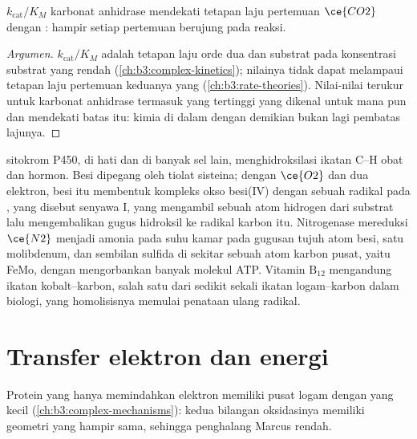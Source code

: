 \begin{proposition}\label{prop:b3:bioinorganic:carbonic-anhydrase}
 $k_{\mathrm{cat}}/K_M$ karbonat anhidrase mendekati tetapan laju
pertemuan $\ce{CO2}$ dengan : hampir setiap pertemuan berujung pada
reaksi.
\end{proposition}

\begin{proof}[Argumen]
$k_{\mathrm{cat}}/K_M$ adalah tetapan laju orde dua  dan substrat pada konsentrasi substrat yang rendah
(\cref{ch:b3:complex-kinetics}); nilainya tidak dapat melampaui
tetapan laju pertemuan keduanya yang 
(\cref{ch:b3:rate-theories}). Nilai-nilai terukur untuk karbonat anhidrase termasuk
yang tertinggi yang dikenal untuk  mana pun dan mendekati batas itu: kimia
di dalam  dengan demikian bukan lagi pembatas lajunya.
\end{proof}

 sitokrom P450, di hati dan di banyak sel lain, menghidroksilasi ikatan
C--H obat dan hormon. Besi  dipegang oleh tiolat sisteina; dengan
$\ce{O2}$ dan dua elektron, besi itu membentuk kompleks okso besi(IV) dengan sebuah radikal pada
, yang disebut senyawa I, yang mengambil sebuah atom hidrogen dari
substrat lalu mengembalikan gugus hidroksil ke radikal karbon itu. Nitrogenase
mereduksi $\ce{N2}$ menjadi amonia pada suhu kamar pada gugusan tujuh atom besi,
satu molibdenum, dan sembilan sulfida di sekitar sebuah atom karbon pusat, yaitu 
FeMo, dengan mengorbankan banyak molekul ATP. Vitamin $\mathrm{B_{12}}$ mengandung
ikatan kobalt--karbon, salah satu dari sedikit sekali ikatan logam--karbon dalam biologi, yang
homolisisnya memulai penataan ulang radikal.

\section{Transfer elektron dan energi}

Protein yang hanya memindahkan elektron memiliki pusat logam dengan  yang kecil (\cref{ch:b3:complex-mechanisms}): kedua bilangan
oksidasinya memiliki geometri yang hampir sama, sehingga penghalang Marcus rendah.

